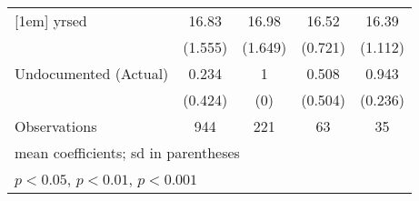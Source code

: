 \begin{table}[htbp]
\begin{tabular}{l*{4}{c}}
[1em]
yrsed               &       16.83         &       16.98         &       16.52         &       16.39         \\
                    &     (1.555)         &     (1.649)         &     (0.721)         &     (1.112)         \\
[1em]
Undocumented (Actual)&       0.234         &           1         &       0.508         &       0.943         \\
                    &     (0.424)         &         (0)         &     (0.504)         &     (0.236)         \\
\hline
Observations        &         944         &         221         &          63         &          35         \\
\hline\hline
\multicolumn{5}{l}{\footnotesize mean coefficients; sd in parentheses}\\
\multicolumn{5}{l}{\footnotesize \sym{*} \(p<0.05\), \sym{**} \(p<0.01\), \sym{***} \(p<0.001\)}\\
\end{tabular}
\end{table}
